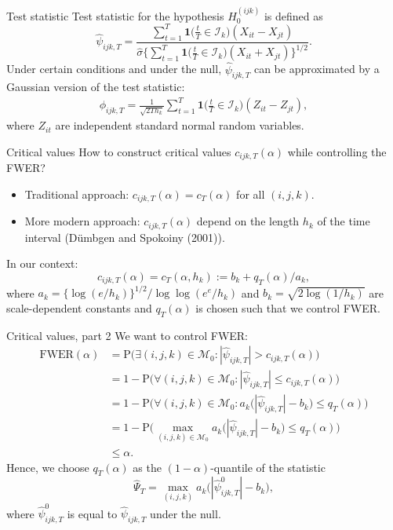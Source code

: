 \documentclass[10pt]{beamer}
\newcommand{\Prob}{\mathrm{P}}
\newcommand{\ind}{\boldsymbol{1}\Big( \frac{t}{T} \in \mathcal{I}_k \Big)} %
\newcommand{\indsmall}{\boldsymbol{1}\big( \frac{t}{T} \in \mathcal{I}_k \big)} %
\begin{document}
\begin{frame}[label = frame_teststatistic]{Test statistic}
Test statistic for the hypothesis $H_0^{(ijk)}$ is defined as
\begin{equation*}
\widehat{\psi}_{ijk, T} = \frac{\sum\nolimits_{t=1}^T \indsmall (X_{it} -X_{jt})}{\hat{\sigma} \big\{ \sum\nolimits_{t=1}^T \indsmall  (X_{it} + X_{jt} )\big\}^{1/2}}. 
\end{equation*} \pause
Under certain conditions and under the null, $\widehat{\psi}_{ijk, T}$ can be approximated by a Gaussian version of the test statistic:
\begin{align*}
\phi_{ijk,T} = \frac{1}{\sqrt{2 T h_k}} \sum\limits_{t=1}^T \ind (Z_{it} - Z_{jt}), 
\end{align*}
where $Z_{it}$ are independent standard normal random variables.
\end{frame}

\begin{frame}{Critical values}
How to construct critical values $c_{ijk,T}(\alpha)$ while controlling the FWER?\pause
\begin{itemize} 
\item Traditional approach: $c_{ijk,T}(\alpha) = c_T(\alpha)$ for all $(i,j,k)$. \pause
\item More modern approach: $c_{ijk,T}(\alpha)$ depend on the length $h_k$ of the time interval (D{\"u}mbgen and Spokoiny (2001)).
\end{itemize}\pause
In our context: 
\vspace{-2mm}
\[c_{ijk,T}(\alpha) = c_T(\alpha,h_k) := b_k + q_T(\alpha)/a_k,\] where $a_k = \{\log(e/h_k)\}^{1/2} / \log \log(e^e / h_k)$ and $b_k = \sqrt{2 \log(1/h_k)}$ are scale-dependent constants and $q_T(\alpha)$ is chosen such that we control FWER.
\end{frame}


\begin{frame}{Critical values, part 2}
We want to control FWER:
\begin{align*}
\text{FWER}(\alpha) &= \Prob \Big( \exists (i,j,k) \in\mathcal{M}_0: |\widehat{\psi}_{ijk, T} | > c_{ijk, T}(\alpha) \Big) \\
&= 1 - \Prob \Big( \forall (i,j,k) \in\mathcal{M}_0: |\widehat{\psi}_{ijk, T} | \le c_{ijk, T}(\alpha) \Big)\\
 & =  1 - \Prob \Big( \forall (i,j,k) \in \mathcal{M}_0: a_k \big(|\hat{\psi}_{ijk,T}| - b_k\big) \le q_T(\alpha) \Big)\\
 & = 1 - \Prob\Big( \max_{(i,j,k) \in \mathcal{M}_0} a_k \big( |\hat{\psi}_{ijk,T}| - b_k \big) \le q_T(\alpha) \Big)\\
 & \le \alpha.
\end{align*}\pause
Hence, we choose $q_T(\alpha)$ as the $(1-\alpha)$-quantile of the statistic 
\[ \hat{\Psi}_T = \max_{(i,j,k)} a_k \big( |\hat{\psi}_{ijk,T}^0| - b_k \big), \]
where $\hat{\psi}_{ijk,T}^0$ is equal to $\hat{\psi}_{ijk,T}$ under the null.
\end{frame}
\end{document}
